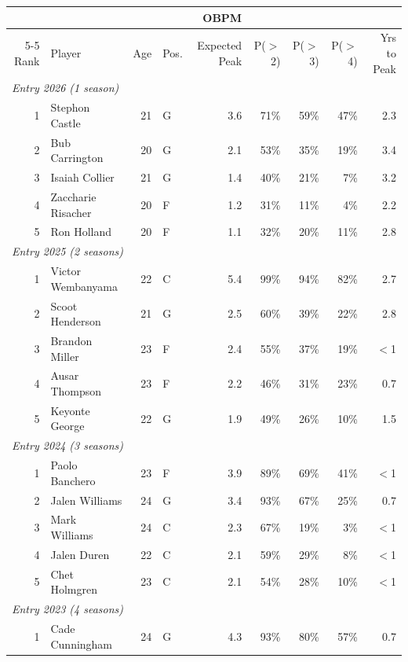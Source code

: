 \begin{table}[htbp]
  \centering\small
  \begin{tabular}{rlrlrrrrr}
    \toprule
     & & & & OBPM & & & & \\
    \cmidrule(lr){5-5}
    Rank & Player & Age & Pos. & Expected Peak & P($>$2) & P($>$3) & P($>$4) & Yrs to Peak \\
    \midrule
    \multicolumn{9}{l}{\textit{Entry 2026 (1 season)}} \\
    \midrule
    1 & Stephon Castle & 21 & G & 3.6 & 71\% & 59\% & 47\% & 2.3 \\
    2 & Bub Carrington & 20 & G & 2.1 & 53\% & 35\% & 19\% & 3.4 \\
    3 & Isaiah Collier & 21 & G & 1.4 & 40\% & 21\% & 7\% & 3.2 \\
    4 & Zaccharie Risacher & 20 & F & 1.2 & 31\% & 11\% & 4\% & 2.2 \\
    5 & Ron Holland & 20 & F & 1.1 & 32\% & 20\% & 11\% & 2.8 \\
    \midrule[0.4pt]
    \multicolumn{9}{l}{\textit{Entry 2025 (2 seasons)}} \\
    \midrule
    1 & Victor Wembanyama & 22 & C & 5.4 & 99\% & 94\% & 82\% & 2.7 \\
    2 & Scoot Henderson & 21 & G & 2.5 & 60\% & 39\% & 22\% & 2.8 \\
    3 & Brandon Miller & 23 & F & 2.4 & 55\% & 37\% & 19\% & $<$1 \\
    4 & Ausar Thompson & 23 & F & 2.2 & 46\% & 31\% & 23\% & 0.7 \\
    5 & Keyonte George & 22 & G & 1.9 & 49\% & 26\% & 10\% & 1.5 \\
    \midrule[0.4pt]
    \multicolumn{9}{l}{\textit{Entry 2024 (3 seasons)}} \\
    \midrule
    1 & Paolo Banchero & 23 & F & 3.9 & 89\% & 69\% & 41\% & $<$1 \\
    2 & Jalen Williams & 24 & G & 3.4 & 93\% & 67\% & 25\% & 0.7 \\
    3 & Mark Williams & 24 & C & 2.3 & 67\% & 19\% & 3\% & $<$1 \\
    4 & Jalen Duren & 22 & C & 2.1 & 59\% & 29\% & 8\% & $<$1 \\
    5 & Chet Holmgren & 23 & C & 2.1 & 54\% & 28\% & 10\% & $<$1 \\
    \midrule[0.4pt]
    \multicolumn{9}{l}{\textit{Entry 2023 (4 seasons)}} \\
    \midrule
    1 & Cade Cunningham & 24 & G & 4.3 & 93\% & 80\% & 57\% & 0.7 \\

\end{tabular}
\end{table}

